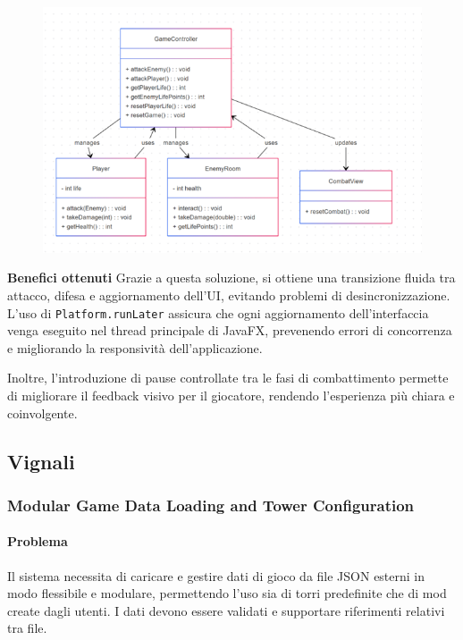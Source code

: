 \documentclass[a4paper,12pt]{report}
\begin{document}
\begin{figure}[H]
	\includegraphics[scale=0.9]{img/montanariPlatform.png}
\end{figure}

\textbf{Benefici ottenuti}
Grazie a questa soluzione, si ottiene una transizione fluida tra attacco, difesa e aggiornamento dell’UI, evitando problemi di desincronizzazione. L’uso di \texttt{Platform.runLater} assicura che ogni aggiornamento dell'interfaccia venga eseguito nel thread principale di JavaFX, prevenendo errori di concorrenza e migliorando la responsività dell'applicazione. 

Inoltre, l'introduzione di pause controllate tra le fasi di combattimento permette di migliorare il feedback visivo per il giocatore, rendendo l’esperienza più chiara e coinvolgente.


\subsection{Vignali}

\subsubsection{Modular Game Data Loading and Tower Configuration}

\paragraph{Problema} Il sistema necessita di caricare e gestire dati di gioco da file JSON esterni in modo flessibile e modulare, permettendo l'uso sia di torri predefinite che di mod create dagli utenti. I dati devono essere validati e supportare riferimenti relativi tra file.
\end{document}
